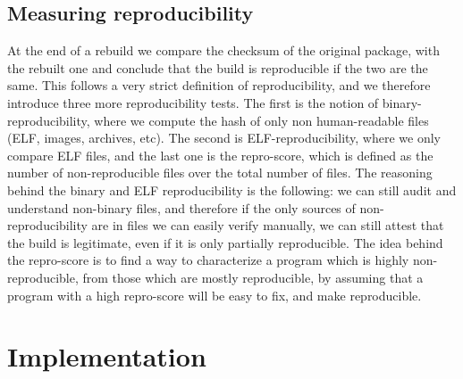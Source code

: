 \documentclass[a4paper,11pt,oneside]{report}
\theoremstyle{definition}
\begin{document}
\section{Measuring reproducibility}
At the end of a rebuild we compare the checksum of the original package, with
the rebuilt one and conclude that the build is reproducible if the two are the
same. This follows a very strict definition of reproducibility, and we
therefore introduce three more reproducibility tests. The first is the notion
of binary-reproducibility, where we compute the hash of only non human-readable
files (ELF, images, archives, etc). The second is ELF-reproducibility, where we
only compare ELF files, and the last one is the repro-score, which is defined
as the number of non-reproducible files over the total number of files. The
reasoning behind the binary and ELF reproducibility is the following: we can
still audit and understand non-binary files, and therefore if the only sources
of non-reproducibility are in files we can easily verify manually, we can still
attest that the build is legitimate, even if it is only partially reproducible.
The idea behind the repro-score is to find a way to characterize a program
which is highly non-reproducible, from those which are mostly reproducible, by
assuming that a program with a high repro-score will be easy to fix, and make
reproducible.


\chapter{Implementation}
\label{chap:impl}
\end{document}

